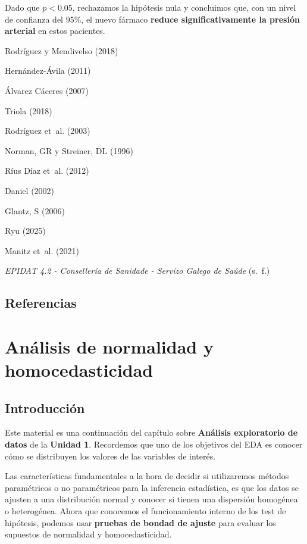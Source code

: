 \documentclass[
  spanish,
  a4paper,
]{scrbook}
\begin{document}
Dado que \(p < 0.05\), rechazamos la hipótesis nula y concluimos que,
con un nivel de confianza del 95\%, el nuevo fármaco \textbf{reduce
significativamente la presión arterial} en estos pacientes.

Rodríguez y Mendivelso (2018)

Hernández-Ávila (2011)

Álvarez Cáceres (2007)

Triola (2018)

Rodríguez et~al. (2003)

Norman, GR y Streiner, DL (1996)

Ríus Díaz et~al. (2012)

Daniel (2002)

Glantz, S (2006)

Ryu (2025)

Manitz et~al. (2021)

\emph{{EPIDAT} 4.2 - {Consellería} de {Sanidade} - {Servizo} {Galego} de
{Saúde}} (s.~f.)

\section*{Referencias}\label{referencias-6}


\chapter{Análisis de normalidad y
homocedasticidad}\label{anuxe1lisis-de-normalidad-y-homocedasticidad}

\section{Introducción}\label{introducciuxf3n-6}

Este material es una continuación del capítulo sobre \textbf{Análisis
exploratorio de datos} de la \textbf{Unidad 1}. Recordemos que uno de
los objetivos del EDA es conocer cómo se distribuyen los valores de las
variables de interés.

Las características fundamentales a la hora de decidir si utilizaremos
métodos paramétricos o no paramétricos para la inferencia estadística,
es que los datos se ajusten a una distribución normal y conocer si
tienen una dispersión homogénea o heterogénea. Ahora que conocemos el
funcionamiento interno de los test de hipótesis, podemos usar
\textbf{pruebas de bondad de ajuste} para evaluar los supuestos de
normalidad y homocedasticidad.
\end{document}
